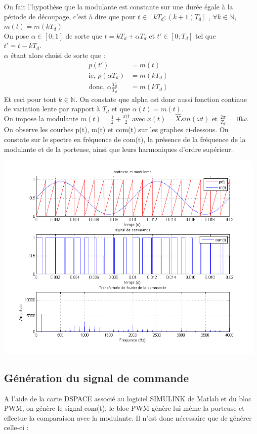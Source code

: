 \documentclass[10pt,a4paper]{article}
\begin{document}
On fait l'hypothèse que la modulante est constante sur une durée égale à la période de découpage, c'est à dire que pour $t \in [kT_d;(k+1)T_d]$ , $ \forall k \in \mathbb{N}$, $m(t) = m(kT_d)$\\
On pose $\alpha \in [0;1]$ de sorte que $t = kT_d + \alpha T_d$ et $t' \in [0;T_d]$ tel que $t' = t-kT_d$.\\
$\alpha$ étant alors choisi de sorte que :
\begin{align*}
p(t') &= m(t)\\
\text{ie,	} p(\alpha T_d) &= m(kT_d)\\
\text{donc,	} \alpha \frac{T_d}{T_d} &= m(kT_d)
\end{align*}
		Et ceci pour tout $k \in \mathbb{N}$. On constate que alpha est donc aussi fonction continue de variation lente par rapport à $T_d$ et que $\alpha(t) = m(t)$.\\
		\bigbreak
		\bigbreak
		On impose la modulante $m(t) = \frac{1}{2} + \frac{x(t}{2}$ avec $x(t) = \hat{X}sin(\omega t)$ et $\frac{2\pi}{T_d}=10\omega$. On observe les courbes p(t), m(t) et com(t) sur les graphes ci-dessous. On constate sur le spectre en fréquence de com(t), la présence de la fréquence de la modulante et de la porteuse, ainsi que leurs harmoniques d'ordre supérieur.\\
		
		\begin{center}
		\includegraphics[scale=0.5]{courbe1.png}
		\end{center}
\subsection{Génération du signal de commande}
A l'aide de la carte DSPACE associé au logiciel SIMULINK de Matlab et du bloc PWM, on génère le signal com(t), le bloc PWM génère lui même la porteuse et effectue la comparaison avec la modulante. Il n'est donc nécessaire que de générer celle-ci :
\end{document}
